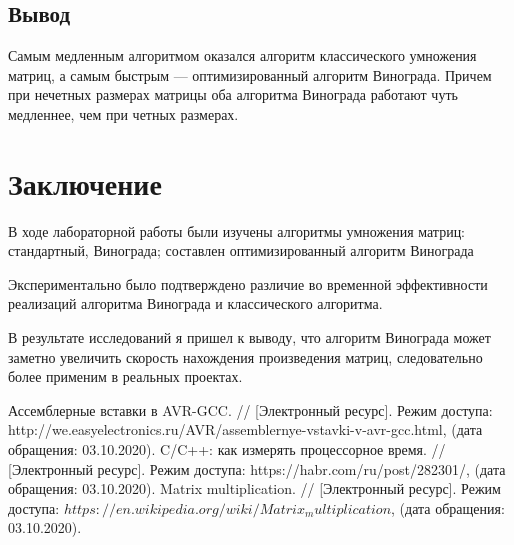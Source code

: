 \documentclass[utf8x, 12pt]{G7-32}
\begin{document}
\section{Вывод}
Самым медленным алгоритмом оказался алгоритм классического умножения матриц, а самым быстрым — оптимизированный алгоритм Винограда. Причем при нечетных размерах матрицы оба алгоритма Винограда работают чуть медленнее, чем при четных размерах.


\chapter*{Заключение}
В ходе лабораторной работы были изучены алгоритмы умножения матриц: стандартный, Винограда; составлен оптимизированный алгоритм Винограда

Экспериментально было подтверждено различие во временной эффективности реализаций алгоритма Винограда и классического алгоритма.

В результате исследований я пришел к выводу, что алгоритм Винограда может заметно увеличить скорость нахождения произведения матриц, следовательно более применим в реальных проектах.
 
\begin{thebibliography}{}
      Ассемблерные вставки в AVR-GCC. // [Электронный ресурс]. Режим доступа: http://we.easyelectronics.ru/AVR/assemblernye-vstavki-v-avr-gcc.html, (дата обращения: 03.10.2020).
      C/C++: как измерять процессорное время. // [Электронный ресурс]. Режим доступа: https://habr.com/ru/post/282301/, (дата обращения: 03.10.2020).
      Matrix multiplication. // [Электронный ресурс]. Режим доступа: $https://en.wikipedia.org/wiki/Matrix_multiplication$, (дата обращения: 03.10.2020).

\end{thebibliography}
\end{document}
